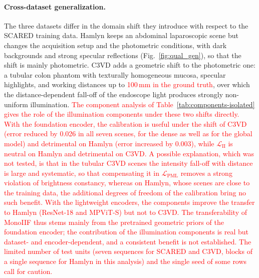 \documentclass[a4paper,fleqn]{cas-dc}
\begin{document}
{\paragraph{Cross-dataset generalization.}
The three datasets differ in the domain shift they introduce with respect to the SCARED training data. Hamlyn keeps an abdominal laparoscopic scene but changes the acquisition setup and the photometric conditions, with dark backgrounds and strong specular reflections (Fig.~\ref{fig:qual_gen}), so that the shift is mainly photometric. C3VD adds a geometric shift to the photometric one: a tubular colon phantom with texturally homogeneous mucosa, specular highlights, and working distances up to \textcolor{red}{100\,mm in the ground truth}, over which the distance-dependent fall-off of the endoscope light produces strongly non-uniform illumination. \textcolor{red}{The component analysis of Table~\ref{tab:components-isolated} gives the role of the illumination components under these two shifts directly. With the foundation encoder, the calibration is useful under the shift of C3VD (error reduced by 0.026 in all seven scenes, for the dense as well as for the global model) and detrimental on Hamlyn (error increased by 0.003), while $\mathcal{L}_\textrm{II}$ is neutral on Hamlyn and detrimental on C3VD. A possible explanation, which was not tested, is that in the tubular C3VD scenes the intensity fall-off with distance is large and systematic, so that compensating it in $\mathcal{L}_\textrm{PML}$ removes a strong violation of brightness constancy, whereas on Hamlyn, whose scenes are close to the training data, the additional degrees of freedom of the calibration bring no such benefit. With the lightweight encoders, the components improve the transfer to Hamlyn (ResNet-18 and MPViT-S) but not to C3VD. The transferability of MonoIIF thus stems mainly from the pretrained geometric priors of the foundation encoder; the contribution of the illumination components is real but dataset- and encoder-dependent, and a consistent benefit is not established. The limited number of test units (seven sequences for SCARED and C3VD, blocks of a single sequence for Hamlyn in this analysis) and the single seed of some rows call for caution.}}
\end{document}
